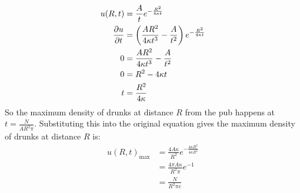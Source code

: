 \documentclass[10pt,oneside,a4paper]{article}
\begin{document}
\begin{enumerate}
\[
\begin{split}
u(R, t) &= \frac{A}{t}e^{-\frac{R^2}{4\kappa t}} \\
\pdv{u}{t} &= \left( \frac{AR^2}{4\kappa t^3} - \frac{A}{t^2}\right)e^{-\frac{R^2}{4\kappa t}} \\
0 &= \frac{AR^2}{4\kappa t^3} - \frac{A}{t^2} \\
0 &= R^2 - 4\kappa t \\
t &= \frac{R^2}{4\kappa} \\
\end{split}
\]
So the maximum density of drunks at distance $R$ from the pub happens at $t = \frac{N}{AR^2 \pi}$. Substituting
this into the original equation gives the maximum density of drunks at distance $R$ is:
\[
\begin{split}
u(R, t)_{\max} &= \frac{4A\kappa}{R^2} e^{-\frac{4\kappa R^2}{4\kappa R^2}} \\
&= \frac{4\pi A\kappa}{R^2 \pi}e^{-1} \\
&= \frac{N}{R^2 \pi e}
\end{split}
\]

\end{enumerate}
\end{document}
